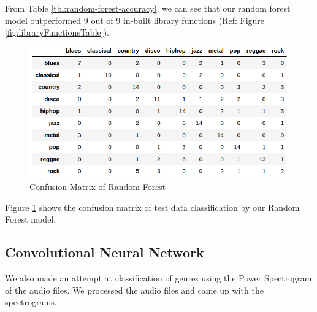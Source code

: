 \documentclass[a4paper,10pt]{article}
\begin{document}
From Table \ref{tbl:random-forest-accuracy}, we can see that our random forest model outperformed 9 out of 9 in-built library functions (Ref: Figure \ref{fig:libraryFunctionsTable}).

\begin{figure}[ht]
    \centering
    \includegraphics[scale=0.5]{rf_cmtx_test.png}
    \caption{Confusion Matrix of Random Forest}
    \label{fig:rf-cmtx-test}
\end{figure}

Figure \ref{fig:rf-cmtx-test} shows the confusion matrix of test data classification by our Random Forest model.

\subsection{Convolutional Neural Network}
We also made an attempt at classification of genres using the Power Spectrogram of the audio files. We processed the audio files and came up with the spectrograms.
\end{document}
